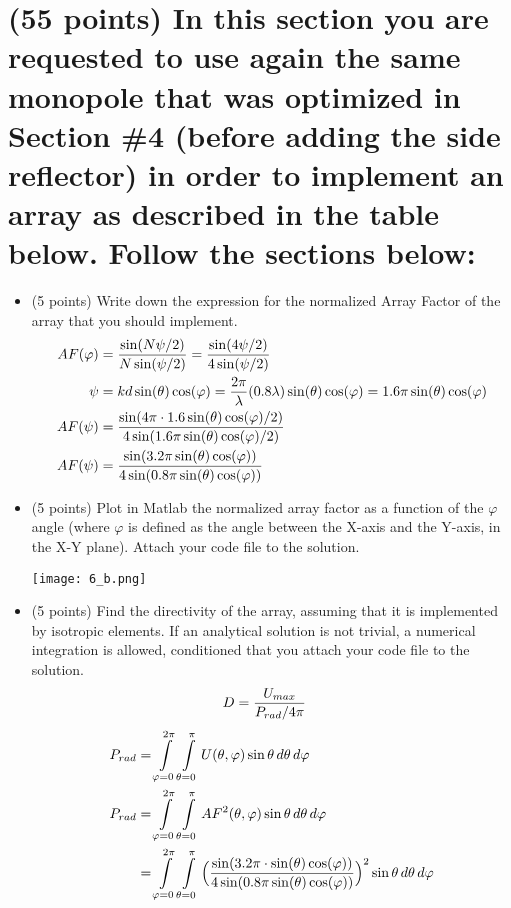\documentclass[12pt, letterpaper]{article}
\begin{document}
\section{(55 points) In this section you are requested to use again the same monopole that was optimized in Section \#4 (before adding the side reflector) in order to implement an array as described in the table below. Follow the sections below:}

\begin{itemize}
  \item (5 points) Write down the expression for the normalized Array Factor of the array that you should implement.
  \begin{align}
    AF(\varphi)
    &=
    {
      \sin(N\psi/2)
      \over
      N\sin(\psi/2)
    }
    =
    {
      \sin(4\psi/2)
      \over
      4\sin(\psi/2)
    }
    \\
    \psi
    &=
    kd\sin(\theta)\cos(\varphi)
    =
    {2\pi\over\lambda}(0.8\lambda)\sin(\theta)\cos(\varphi)
    =
    1.6\pi\sin(\theta)\cos(\varphi)
    \\
    AF(\psi)
    &=
    {
      \sin(4\pi\cdot 1.6\sin(\theta)\cos(\varphi)/2)
      \over
      4\sin(1.6\pi\sin(\theta)\cos(\varphi)/2)
    }
    \\
    AF(\psi)
    &=
    {
      \sin(3.2\pi\sin(\theta)\cos(\varphi))
      \over
      4\sin(0.8\pi\sin(\theta)\cos(\varphi))
    }
  \end{align}
  \item (5 points) Plot in Matlab the normalized array factor as a function of the $\varphi$ angle (where $\varphi$ is defined as the angle between the X-axis and the Y-axis, in the X-Y plane). Attach your code file to the solution.
  \begin{center}
    \texttt{[image: 6\_b.png]}
  \end{center}
  \item (5 points) Find the directivity of the array, assuming that it is implemented by isotropic elements. If an analytical solution is not trivial, a numerical integration is allowed, conditioned that you attach your code file to the solution.
  \begin{align}
    D
    &=
    {
      U_{max}
      \over
      P_{rad}/4\pi
    }
  \end{align}
  \begin{align}
    P_{rad}
    &=
    \int\limits_{\varphi=0}^{2\pi}\int\limits_{\theta=0}^{\pi}U(\theta,\varphi)\sin\theta \,d \theta\,d\varphi
    \\
    P_{rad}
    &=
    \int\limits_{\varphi=0}^{2\pi}\int\limits_{\theta=0}^{\pi}AF^2(\theta,\varphi)\sin\theta \,d \theta\,d\varphi
    \\
    &=
    \int\limits_{\varphi=0}^{2\pi}\int\limits_{\theta=0}^{\pi}
    \Big({
      \sin(3.2\pi\cdot \sin(\theta)\cos(\varphi))
      \over
      4\sin(0.8\pi\sin(\theta)\cos(\varphi))
    }\Big)^2\sin\theta \,d \theta\,d\varphi
  \end{align}


\end{itemize}
\end{document}
